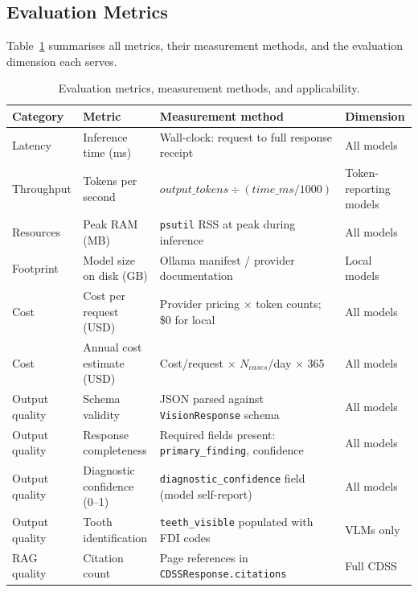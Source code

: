 \documentclass[12pt,a4paper]{report}
\begin{document}
\subsection{Evaluation Metrics}
\label{subsec:metrics}

Table~\ref{tab:metrics} summarises all metrics, their measurement
methods, and the evaluation dimension each serves.

\begin{table}[H]
\centering
\caption{Evaluation metrics, measurement methods, and applicability.}
\label{tab:metrics}
\small
\renewcommand{\arraystretch}{1.2}
\begin{tabularx}{\textwidth}{@{}l l X l@{}}
\toprule
\textbf{Category} & \textbf{Metric} & \textbf{Measurement method} & \textbf{Dimension} \\
\midrule
Latency       & Inference time (ms)          & Wall-clock: request to full response receipt                 & All models \\
Throughput    & Tokens per second            & $\mathit{output\_tokens} \div (\mathit{time\_ms}/1000)$      & Token-reporting models \\
Resources     & Peak RAM (MB)                & \texttt{psutil} RSS at peak during inference                 & All models \\
Footprint     & Model size on disk (GB)      & Ollama manifest / provider documentation                     & Local models \\
Cost          & Cost per request (USD)       & Provider pricing $\times$ token counts; \$0 for local        & All models \\
Cost          & Annual cost estimate (USD)   & Cost/request $\times$ $N_{\mathit{cases}}$/day $\times$ 365  & All models \\
Output quality & Schema validity             & JSON parsed against \texttt{VisionResponse} schema           & All models \\
Output quality & Response completeness       & Required fields present: \texttt{primary\_finding}, confidence & All models \\
Output quality & Diagnostic confidence (0--1)& \texttt{diagnostic\_confidence} field (model self-report)    & All models \\
Output quality & Tooth identification         & \texttt{teeth\_visible} populated with FDI codes             & VLMs only \\
RAG quality   & Citation count               & Page references in \texttt{CDSSResponse.citations}           & Full CDSS \\

\end{tabularx}
\end{table}
\end{document}
